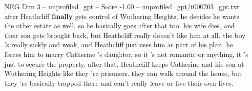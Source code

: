 \begin{textsample}{NEG Dim 3 – unprofiled\_gpt – Score -1.00 – unprofiled\_gpt/t000205\_gpt.txt}  \label{ex:f3_neg_015}
after Heathcliff \textbf{finally} gets control of Wuthering Heights, he decides he wants the other estate as well, so he basically goes after that too. his wife dies, and their son gets brought back, but Heathcliff really doesn't like him at all. the boy ’s really sickly and weak, and Heathcliff just uses him as part of his plan. he forces him to marry Catherine ’s daughter, so it ’s not romantic or anything, it ’s just to secure the property. after that, Heathcliff keeps Catherine and his son at Wuthering Heights like they ’re prisoners. they can walk around the house, but they ’re basically trapped there and can't really leave or live their own lives.

\end{textsample}
